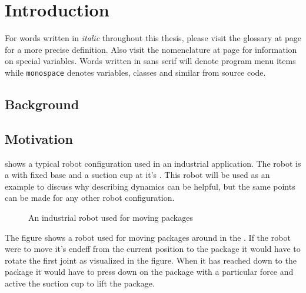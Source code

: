\chapter{Introduction}

For words written in \textit{italic} throughout this thesis, please visit the glossary at page \pageref{glossary} for a more precise definition. Also visit the nomenclature at page \pageref{nomenclature} for information on special variables. Words written in \textsf{sans serif} will denote program menu items while \texttt{monospace} denotes variables, classes and similar from source code.

\section{Background}


\section{Motivation}

 shows a typical robot configuration used in an industrial application. The robot is a  with fixed base and a suction cup at it's . This robot will be used as an example to discuss why describing dynamics can be helpful, but the same points can be made for any other robot configuration.

\begin{figure}[h!]    
    \centering           
    \def\svgwidth{.8\columnwidth}
    
    \caption{An industrial robot used for moving packages}
    \label{exampleCase}
\end{figure}

The figure shows a robot used for moving packages around in the . If the robot were to move it's \gls{endeff} from the current position to the package it would have to rotate the first joint as visualized in the figure. When it has reached down to the package it would have to press down on the package with a particular force and active the suction cup to lift the package.

